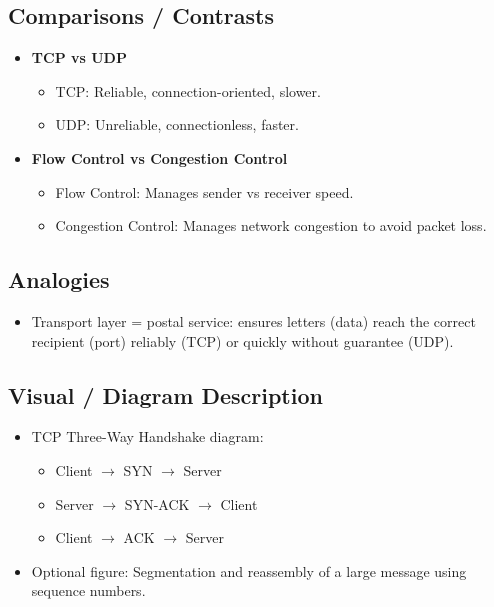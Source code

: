 \documentclass[12pt]{article}
\begin{document}
\subsection{Comparisons / Contrasts}
\begin{itemize}
    \item \textbf{TCP vs UDP}
          \begin{itemize}
              \item TCP: Reliable, connection-oriented, slower.
              \item UDP: Unreliable, connectionless, faster.
          \end{itemize}
    \item \textbf{Flow Control vs Congestion Control}
          \begin{itemize}
              \item Flow Control: Manages sender vs receiver speed.
              \item Congestion Control: Manages network congestion to avoid packet loss.
          \end{itemize}
\end{itemize}

\subsection{Analogies}
\begin{itemize}
    \item Transport layer = postal service: ensures letters (data) reach the correct recipient (port) reliably (TCP) or quickly without guarantee (UDP).
\end{itemize}

\subsection{Visual / Diagram Description}
\begin{itemize}
    \item TCP Three-Way Handshake diagram:
          \begin{itemize}
              \item Client $\rightarrow$ SYN $\rightarrow$ Server
              \item Server $\rightarrow$ SYN-ACK $\rightarrow$ Client
              \item Client $\rightarrow$ ACK $\rightarrow$ Server
          \end{itemize}
    \item Optional figure: Segmentation and reassembly of a large message using sequence numbers.
\end{itemize}
\end{document}
